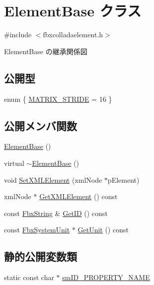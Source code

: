 \hypertarget{class_element_base}{}\section{Element\+Base クラス}
\label{class_element_base}


{\ttfamily \#include $<$fbxcolladaelement.\+h$>$}



Element\+Base の継承関係図
\subsection*{公開型}
\begin{DoxyCompactItemize}
\item 
enum \{ \hyperlink{class_element_base_a67c3058543230affdf2d6ebb71a2acc5a858ba1419e1ab2616ccb5fbd91557074}{M\+A\+T\+R\+I\+X\+\_\+\+S\+T\+R\+I\+DE} = 16
 \}
\end{DoxyCompactItemize}
\subsection*{公開メンバ関数}
\begin{DoxyCompactItemize}
\item 
\hyperlink{class_element_base_a4c7415e032db4a4d1890edd5fed2eb01}{Element\+Base} ()
\item 
virtual \hyperlink{class_element_base_a564b84810083ca6558d00c331bd9eccd}{$\sim$\+Element\+Base} ()
\item 
void \hyperlink{class_element_base_a7d2be8b683fab79fab4c45aaf484f18c}{Set\+X\+M\+L\+Element} (xml\+Node $\ast$p\+Element)
\item 
xml\+Node $\ast$ \hyperlink{class_element_base_adb072862588f793bb86e70f43df92b27}{Get\+X\+M\+L\+Element} () const
\item 
const \hyperlink{class_fbx_string}{Fbx\+String} \& \hyperlink{class_element_base_a9a8bf10158b3028d050f17d357be5ebb}{Get\+ID} () const
\item 
const \hyperlink{class_fbx_system_unit}{Fbx\+System\+Unit} $\ast$ \hyperlink{class_element_base_a1449309f004525a5c009d1fb7d3cb60c}{Get\+Unit} () const
\end{DoxyCompactItemize}
\subsection*{静的公開変数類}
\begin{DoxyCompactItemize}
\item 
static const char $\ast$ \hyperlink{class_element_base_a9f75c1fda20fcc3c553e18c36be8221b}{sm\+I\+D\+\_\+\+P\+R\+O\+P\+E\+R\+T\+Y\+\_\+\+N\+A\+ME}
\end{DoxyCompactItemize}


